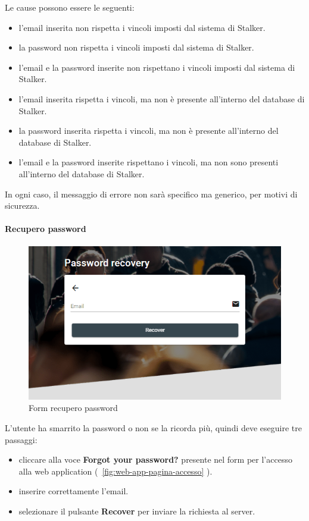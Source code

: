 \documentclass[../manuale-utente.tex]{subfiles}
\begin{document}
Le cause possono essere le seguenti:
\begin{itemize}
    \item l'email inserita non rispetta i vincoli imposti dal sistema di Stalker.
    \item la password non rispetta i vincoli imposti dal sistema di Stalker.
    \item l'email e la password inserite non rispettano i vincoli imposti dal sistema di Stalker.
    \item l'email inserita rispetta i vincoli, ma non è presente all'interno del database di Stalker.
    \item la password inserita rispetta i vincoli, ma non è presente all'interno del database di Stalker.
    \item l'email e la password inserite rispettano i vincoli, ma non sono presenti all'interno del database di Stalker.
\end{itemize}

In ogni caso, il messaggio di errore non sarà specifico ma generico, per motivi di sicurezza.
\newpage

\paragraph{Recupero password}%
\label{par:recupero_password}

\begin{figure}[H]
    \centering
    \includegraphics[width=150mm]{img/web-app/recupero-password.png}
    \caption{Form recupero password}%
    \label{fig:web_app_form_recupero_password}
\end{figure}

L'utente ha smarrito la password o non se la ricorda più, quindi deve eseguire tre passaggi:
\begin{itemize}
    \item cliccare alla voce \textbf{Forgot your password?} presente nel form per l'accesso alla web application (~\ref{fig:web-app-pagina-accesso} ).
    \item inserire correttamente l'email.
    \item selezionare il pulsante \textbf{Recover} per inviare la richiesta al server.
\end{itemize}
\end{document}
